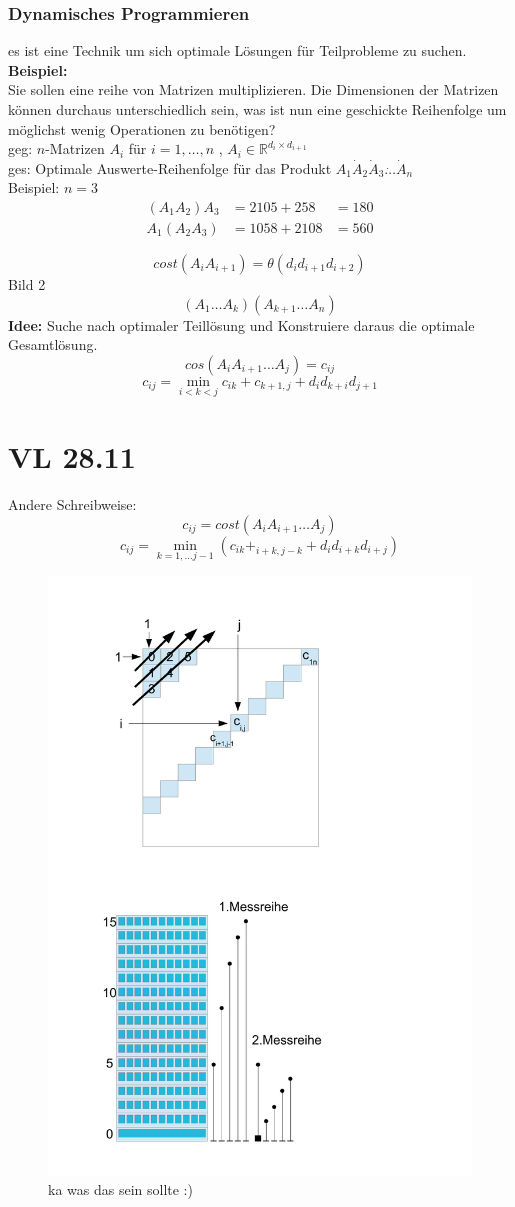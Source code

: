 \documentclass[a4paper,twoside,10pt]{report}
\begin{document}
\subsection{Dynamisches Programmieren}
es ist eine Technik um sich optimale Lösungen für Teilprobleme zu suchen.\\
\textbf{Beispiel:}\\
Sie sollen eine reihe von Matrizen multiplizieren. Die Dimensionen der Matrizen können durchaus unterschiedlich sein, was ist nun eine geschickte Reihenfolge um möglichst wenig Operationen zu benötigen?\\
geg: $n$-Matrizen $A_i$ für $i=1,\hdots,n$ , $A_i\in\mathbb R^{d_i\times d_{i+1}}$\\
ges: Optimale Auswerte-Reihenfolge für das Produkt $A_1 \dot A_2 \dot A_3 \dot \hdots \dot A_n$\\
Beispiel: $n=3$\\
\begin{align*}
(A_1 A_2) A_3 &= 2 10 5 + 2 5 8 &=180\\
A_1 (A_2 A_3) &= 10 5 8 + 2 10 8&= 560
\end{align*}

\[cost(A_i A_{i+1})=\theta(d_i d_{i+1} d_{i+2})\]
Bild 2\\
\[(A_1\hdots A_k)(A_{k+1}\hdots A_n)\]
\textbf{Idee:} Suche nach optimaler Teillösung und Konstruiere daraus die optimale Gesamtlösung.\\
\[cos(A_i A_{i+1} \hdots A_j)=c_{ij}\]
\[c_{ij}=\min_{i<k<j}c_{ik}+c_{k+1,j}+d_{i}d_{k+i}d_{j+1}\]
\chapter{VL 28.11}
Andere Schreibweise:
\[c_{ij}=cost(A_i A_{i+1} \hdots A_j)\]
\[c_{ij}=\min_{k=1,\hdots j-1}(c_{ik}+_{i+k,j-k}+d_id_{i+k}d_{i+j})\]
\begin{figure}[H]\center
\includegraphics[trim= 3cm 16cm 7cm 2cm,clip,width=.7\columnwidth]{figures/skyscraper.pdf}
\caption{ka was das sein sollte :)}
\end{figure}
\end{document}
